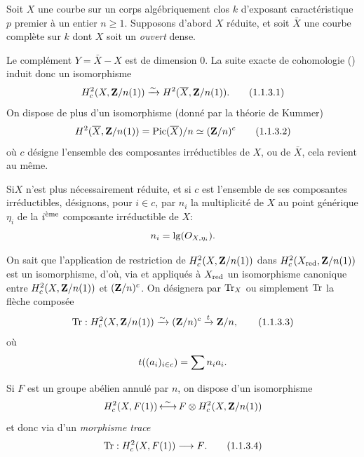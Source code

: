 \documentclass[10pt]{../fichiers-configuration-latex/smfart}
\begin{document}
\setcounter{subsubsection}{2}
\subsubsection{}
Soit $X$ une courbe sur un corps algébriquement clos $k$ d'exposant
caractéristique $p$ premier à un entier $n\geq 1$. Supposons d'abord
$X$ réduite, et soit $\bar{X}$ une courbe complète sur $k$ dont $X$
soit un \emph{ouvert} dense.

Le complément $Y=\bar{X}-X$ est de dimension $0$. La suite exacte de
cohomologie () induit donc un isomorphisme
\begin{equation*}
H^{2}_{c}(X,\mathbf{Z}/n(1))\xrightarrow{\sim} H^{2}(\overline{X},\mathbf{Z}/n(1)){}.\tag{1.1.3.1}
\end{equation*}%
On dispose de plus d'un isomorphisme  (donné par la théorie de
Kummer)
\begin{equation*}
H^{2}(\overline{X},\mathbf{Z}/n(1))=\operatorname{Pic}(\overline{X})/n\simeq(\mathbf{Z}/n)^{c}\tag{1.1.3.2}
\end{equation*}%
où $c$ désigne l'ensemble des composantes irréductibles de $X$, ou de
$\bar{X}$, cela revient au même.

Si\pageoriginale $X$ n'est plus nécessairement réduite, et si $c$ est
l'ensemble de ses composantes irréductibles, désignons, pour $i\in c$,
par $n_{i}$ la multiplicité de $X$ au point générique $\eta_{i}$ de la
$i^{\text{\rm ème}}$ composante irréductible de $X$:
$$
n_{i}=\lg(O_{X,\eta_{i}}){}.
$$

On sait que l'application de restriction de
$H^{2}_{c}(X,\mathbf{Z}/n(1))$ dans $H^{2}_{c}(X_{\operatorname{red}},
\mathbf{Z}/n(1))$ est un isomorphisme, d'où, via 
et  appliqués à $X_{\text{\rm red}}$ un isomorphisme
canonique entre $H^{2}_{c}(X,\mathbf{Z}/n(1))$ et
$(\mathbf{Z}/n)^{c}$. On désignera par $\operatorname{Tr}_{X}$ ou simplement $\operatorname{Tr}$
la flèche composée
\begin{equation*}
\operatorname{Tr}:H^{2}_{c}(X,\mathbf{Z}/n(1))\xrightarrow{\sim}(\mathbf{Z}/n)^{c}\xrightarrow{t}\mathbf{Z}/n{},\tag{1.1.3.3}
\end{equation*}%
où
$$
t((a_{i})_{i\in c})=\sum n_{i}a_{i}{}.
$$

Si $F$ est un groupe abélien annulé par $n$, on dispose d'un
isomorphisme
$$
H^{2}_{c}(X,F(1))\mathop{\longleftrightarrow}^{\sim}F\otimes
H^{2}_{c}(X,\mathbf{Z}/n(1))
$$
et donc via  d'un \emph{morphisme trace}
\begin{equation*}
\operatorname{Tr}:H^{2}_{c}(X,F(1))\longrightarrow F{}.\tag{1.1.3.4}
\end{equation*}
\end{document}
